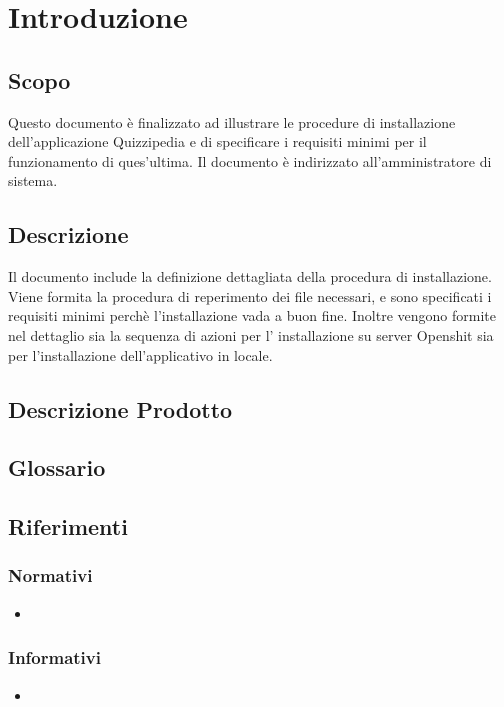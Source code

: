 \documentclass[12pt,a4paper]{article}
\begin{document}
	\newpage
	\tableofcontents
	\newpage
	\listoftables
	\listoffigures
	\newpage
	
	
	\section{Introduzione}	\label{intro}
	
	\subsection{Scopo}
	Questo documento è finalizzato ad illustrare le procedure di installazione dell'applicazione Quizzipedia e di specificare i requisiti minimi per il funzionamento di ques'ultima. Il documento è indirizzato all'amministratore di sistema.
	\subsection{Descrizione}
    Il documento include la definizione dettagliata della procedura di installazione. Viene formita la procedura di reperimento dei file necessari, e sono specificati i requisiti minimi perchè l'installazione vada a buon fine.
    Inoltre vengono formite nel dettaglio sia la sequenza di azioni per l' installazione su server Openshit sia per l'installazione dell'applicativo in locale.
   
	
	\subsection{Descrizione Prodotto}
	\descrizioneProdotto
	
	\subsection{Glossario}
	\glossarioPrint
	
	\subsection{Riferimenti}
	
	\subsubsection{Normativi}
	\begin{itemize}
		\item
		
	\end{itemize}
	
	\subsubsection{Informativi}
	\begin{itemize}
		\item 
	\end{itemize}
	
\end{document}
